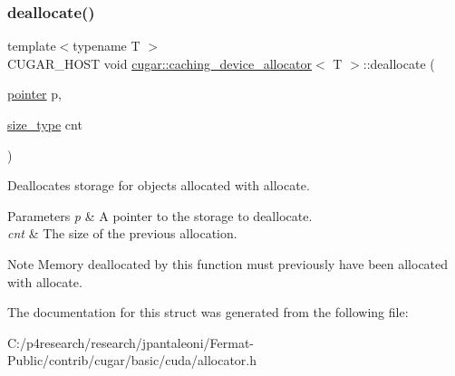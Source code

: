 \subsubsection{\texorpdfstring{deallocate()}{deallocate()}}
{\footnotesize\ttfamily template$<$typename T $>$ \\
C\+U\+G\+A\+R\+\_\+\+H\+O\+ST void \hyperlink{structcugar_1_1caching__device__allocator}{cugar\+::caching\+\_\+device\+\_\+allocator}$<$ T $>$\+::deallocate (\begin{DoxyParamCaption}\item[{\hyperlink{structcugar_1_1caching__device__allocator_a442ab01357a3851bb0e9f17c5e49fce3}{pointer}}]{p,  }\item[{\hyperlink{structcugar_1_1caching__device__allocator_a6ac404077fed53edacca4e62b15fdbe9}{size\+\_\+type}}]{cnt }\end{DoxyParamCaption})\hspace{0.3cm}{\ttfamily [inline]}}

Deallocates storage for objects allocated with {\ttfamily allocate}. 
\begin{DoxyParams}{Parameters}
{\em p} & A {\ttfamily pointer} to the storage to deallocate. \\
\hline
{\em cnt} & The size of the previous allocation. \\
\hline
\end{DoxyParams}
\begin{DoxyNote}{Note}
Memory deallocated by this function must previously have been allocated with {\ttfamily allocate}. 
\end{DoxyNote}


The documentation for this struct was generated from the following file\+:\begin{DoxyCompactItemize}
\item 
C\+:/p4research/research/jpantaleoni/\+Fermat-\/\+Public/contrib/cugar/basic/cuda/allocator.\+h\end{DoxyCompactItemize}

